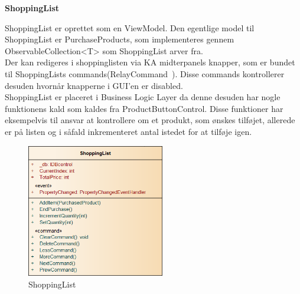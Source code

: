 \textbf{ShoppingList}

ShoppingList er oprettet som en ViewModel. Den egentlige model til ShoppingList er PurchaseProducts, som implementeres gennem ObservableCollection<T> som ShoppingList arver fra.\\
Der kan redigeres i shoppinglisten via \gls{KA} midterpanels knapper, som er bundet til ShoppingLists commands(RelayCommand~\cite{RelayC}). Disse commands kontrollerer desuden hvornår knapperne i GUI'en er disabled.\\
ShoppingList er placeret i Business Logic Layer da denne desuden har nogle funktionens kald som kaldes fra ProductButtonControl. Disse funktioner har eksempelvis til ansvar at kontrollere om et produkt, som ønskes tilføjet, allerede er på listen og i såfald inkrementeret antal istedet for at tilføje igen. 

\begin{figure}[H]
	\centering
	\includegraphics[width=60mm]{Systemdesign/Frontend/BLL/Pics/ShoppingList}
	\caption{ShoppingList}
	\label{fig:ShoppingList}
\end{figure}

\bigskip